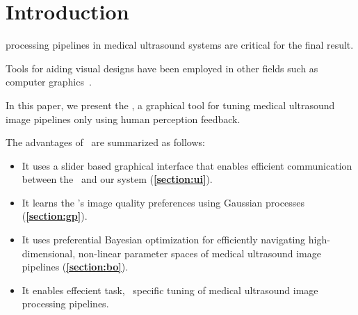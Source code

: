 
\section{Introduction}\label{section:introduction}
 processing pipelines in medical ultrasound systems are critical for the final result.

Tools for aiding visual designs have been employed in other fields such as computer graphics~\cite{10.1145/258734.258887}.

In this paper, we present the \usdg, a graphical tool for tuning medical ultrasound image pipelines only using human perception feedback.

The advantages of \usdg~are summarized as follows:
\begin{itemize}
  \item It uses a slider based graphical interface that enables efficient communication between the \user~and our system (\textbf{\cref{section:ui}}).
  \item It learns the \user's image quality preferences using Gaussian processes (\textbf{\cref{section:gp}}).
  \item It uses preferential Bayesian optimization for efficiently navigating high-dimensional, non-linear parameter spaces of medical ultrasound image pipelines (\textbf{\cref{section:bo}}).
  \item It enables effecient task, \user~specific tuning of medical ultrasound image processing pipelines.
\end{itemize}


